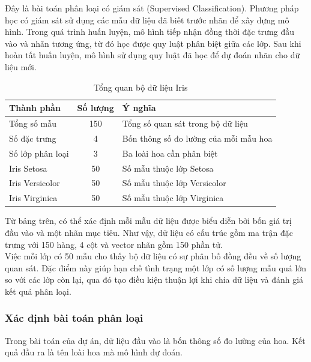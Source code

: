 \documentclass[14pt]{extarticle}
\begin{document}
		\noindent Đây là bài toán phân loại có giám sát (Supervised Classification). Phương pháp học có giám sát sử dụng các mẫu dữ liệu đã biết trước nhãn để xây dựng mô hình. Trong quá trình huấn luyện, mô hình tiếp nhận đồng thời đặc trưng đầu vào và nhãn tương ứng, từ đó học được quy luật phân biệt giữa các lớp. Sau khi hoàn tất huấn luyện, mô hình sử dụng quy luật đã học để dự đoán nhãn cho dữ liệu mới.\\
	
	\begin{table}[htbp]
		\centering
		\caption{Tổng quan bộ dữ liệu Iris}
		\label{tab:iris-overview}
		\begin{tabular}{|l|c|l|}
			\hline
			\textbf{Thành phần} & \textbf{Số lượng} & \textbf{Ý nghĩa} \\
			\hline
			Tổng số mẫu & 150 & Tổng số quan sát trong bộ dữ liệu \\
			\hline
			Số đặc trưng & 4 & Bốn thông số đo lường của mỗi mẫu hoa \\
			\hline
			Số lớp phân loại & 3 & Ba loài hoa cần phân biệt \\
			\hline
			Iris Setosa & 50 & Số mẫu thuộc lớp Setosa \\
			\hline
			Iris Versicolor & 50 & Số mẫu thuộc lớp Versicolor \\
			\hline
			Iris Virginica & 50 & Số mẫu thuộc lớp Virginica \\
			\hline
		\end{tabular}
	\end{table}
	
		\noindent Từ bảng trên, có thể xác định mỗi mẫu dữ liệu được biểu diễn bởi bốn giá trị đầu vào và một nhãn mục tiêu. Như vậy, dữ liệu có cấu trúc gồm ma trận đặc trưng với 150 hàng, 4 cột và vector nhãn gồm 150 phần tử.\\
	
		\noindent Việc mỗi lớp có 50 mẫu cho thấy bộ dữ liệu có sự phân bố đồng đều về số lượng quan sát. Đặc điểm này giúp hạn chế tình trạng một lớp có số lượng mẫu quá lớn so với các lớp còn lại, qua đó tạo điều kiện thuận lợi khi chia dữ liệu và đánh giá kết quả phân loại.\\
	
	\subsubsection{Xác định bài toán phân loại}
	
		\noindent Trong bài toán của dự án, dữ liệu đầu vào là bốn thông số đo lường của hoa. Kết quả đầu ra là tên loài hoa mà mô hình dự đoán.\\
	
\end{document}
